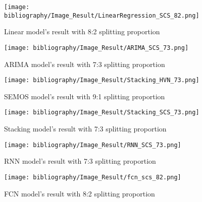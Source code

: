 \documentclass{ieeeojies}
\begin{document}
\begin{figure}[H]
  \centering
  \begin{minipage}{0.8\linewidth}
    \centering
    \texttt{[image: bibliography/Image\_Result/LinearRegression\_SCS\_82.png]}
    \caption{Linear model's result with 8:2 splitting proportion}
    \label{fig8}
  \end{minipage}
\end{figure}

\begin{figure}[H]
  \centering
  \begin{minipage}{0.8\linewidth}
    \centering
    \texttt{[image: bibliography/Image\_Result/ARIMA\_SCS\_73.png]}
    \caption{ARIMA model's result with 7:3 splitting proportion}
    \label{fig9}
  \end{minipage}
\end{figure}

\begin{figure}[H]
  \centering
  \begin{minipage}{0.8\linewidth}
    \centering
    \texttt{[image: bibliography/Image\_Result/Stacking\_HVN\_73.png]}
    \caption{SEMOS model's result with 9:1 splitting proportion}
    \label{fig8}
  \end{minipage}
\end{figure}

\begin{figure}[H]
  \centering
  \begin{minipage}{0.8\linewidth}
    \centering
    \texttt{[image: bibliography/Image\_Result/Stacking\_SCS\_73.png]}
    \caption{Stacking model's result with 7:3 splitting proportion}
    \label{fig9}
  \end{minipage}
\end{figure}

\begin{figure}[H]
  \centering
  \begin{minipage}{0.8\linewidth}
    \centering
    \texttt{[image: bibliography/Image\_Result/RNN\_SCS\_73.png]}
    \caption{RNN model's result with 7:3 splitting proportion}
    \label{fig8}
  \end{minipage}
\end{figure}

\begin{figure}[H]
  \centering
  \begin{minipage}{0.8\linewidth}
    \centering
    \texttt{[image: bibliography/Image\_Result/fcn\_scs\_82.png]}
    \caption{FCN model's result with 8:2 splitting proportion}
    \label{fig9}
  \end{minipage}
\end{figure}
\end{document}
